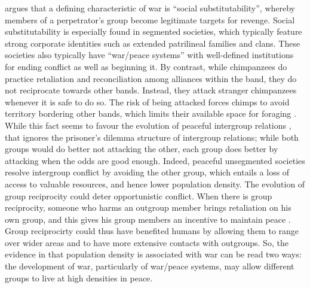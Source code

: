 \documentclass[12pt,a4paper]{article}\usepackage[]{graphicx}\usepackage[]{color}
\begin{document}
\citet{kelly2000warless} argues that a defining characteristic of war is ``social substitutability'', whereby members
of a perpetrator's group become legitimate targets for revenge. Social substitutability is especially found in segmented
societies, which typically feature strong corporate identities such as extended patrilineal families and clans. 
These societies also
typically have ``war/peace systems'' with well-defined institutions for ending conflict as well as beginning it. By 
contrast, while chimpanzees do practice retaliation and reconciliation among alliances within the band, they  do not 
reciprocate towards other bands. Instead, they attack stranger chimpanzees whenever it is safe to do so. The risk of 
being attacked forces chimps to avoid territory bordering other bands, which limits their available space for foraging 
\citep{wilson2003intergroup}. While this fact seems to favour the evolution of peaceful intergroup relations 
\citep{kelly2005evolution}, that ignores the prisoner's dilemma structure of intergroup relations; while both groups would
do better not attacking the other, each group does better by attacking when the odds are good enough. Indeed, peaceful
unsegmented societies resolve intergroup conflict by avoiding the other group, which entails a loss of access to valuable
resources, and hence lower population density. The evolution of group 
reciprocity could deter opportunistic conflict. When there is group reciprocity, someone who harms an outgroup member 
brings retaliation on his own group, and this gives his group members an incentive to maintain peace 
\citep{boehm1984blood}. Group reciprocirty could thus have benefited humans by allowing them to range over wider 
areas and to have more extensive contacts with outgroups.  So, the evidence in \citet{kelly2000warless} that population 
density is associated with war can be read two ways: the development of war, particularly of war/peace systems, may 
allow different groups to live at high densities in peace.
\end{document}
